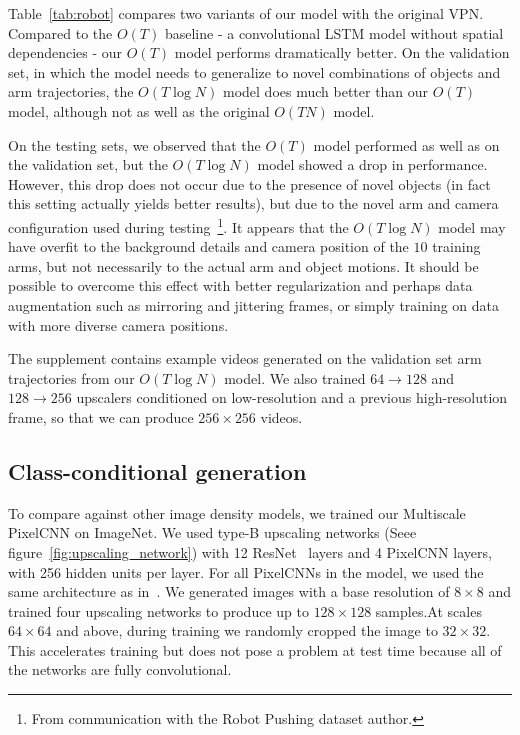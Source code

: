 \documentclass{article}
\begin{document}
Table~\ref{tab:robot} compares two variants of our model with the original VPN.
Compared to the $O(T)$ baseline - a convolutional LSTM model without spatial dependencies - our $O(T)$ model performs dramatically better.
On the validation set, in which the model needs to generalize to novel combinations of objects and arm trajectories, the $O(T \log N)$ model does much better than our $O(T)$ model, although not as well as the original $O(TN)$ model.

On the testing sets, we observed that the $O(T)$ model performed as well as on the validation set, but the $O(T\log N)$ model showed a drop in performance.
However, this drop does not occur due to the presence of novel objects (in fact this setting actually yields better results), but due to the novel arm and camera configuration used during testing~\footnote{From communication with the Robot Pushing dataset author.}.
It appears that the $O(T \log N)$ model may have overfit to the background details and camera position of the $10$ training arms, but not necessarily to the actual arm and object motions.
It should be possible to overcome this effect with better regularization and perhaps data augmentation such as mirroring and jittering frames, or simply training on data with more diverse camera positions.

The supplement contains example videos generated on the validation set arm trajectories from our $O(T \log N)$ model.
We also trained $64 \rightarrow 128$ and $128 \rightarrow 256$ upscalers conditioned on low-resolution and a previous high-resolution frame, so that we can produce $256 \times 256$ videos.


\subsection{Class-conditional generation}
To compare against other image density models, we trained our Multiscale PixelCNN on ImageNet.
We used type-B upscaling networks (Seee figure~\ref{fig:upscaling_network}) with 12 ResNet~\cite{he2016identity} layers and 4 PixelCNN layers, with 256 hidden units per layer.
For all PixelCNNs in the model, we used the same architecture as in~\citep{oord2016conditional}.
We generated images with a base resolution of $8 \times 8$ and trained four upscaling networks to produce up to $128 \times 128$ samples.At scales $64 \times 64$ and above, during training we randomly cropped the image to $32 \times 32$.
This accelerates training but does not pose a problem at test time because all of the networks are fully convolutional.
\end{document}
